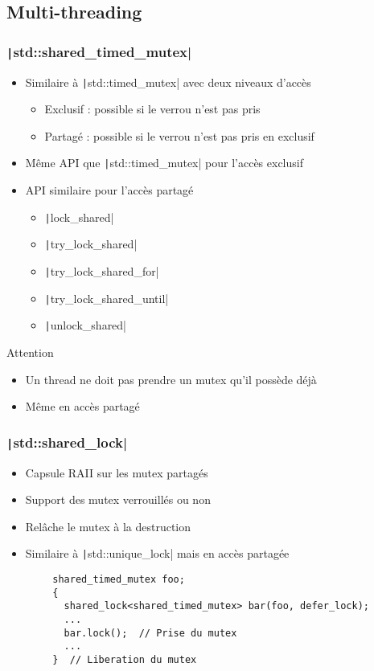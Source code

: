 \documentclass[C++.tex]{subfiles}
\begin{document}
\subsection*{Multi-threading}
\begin{frame}[fragile]
	\frametitle{\texttt|std::shared_timed_mutex|}
	\begin{itemize}
		\item Similaire à \texttt|std::timed_mutex| avec deux niveaux d'accès
		\begin{itemize}
			\item Exclusif : possible si le verrou n'est pas pris
			\item Partagé : possible si le verrou n'est pas pris en exclusif
		\end{itemize}
		\item Même API que \texttt|std::timed_mutex| pour l'accès exclusif
		\item API similaire pour l'accès partagé
		\begin{itemize}
			\item \texttt|lock_shared|
			\item \texttt|try_lock_shared|
			\item \texttt|try_lock_shared_for|
			\item \texttt|try_lock_shared_until|
			\item \texttt|unlock_shared|
		\end{itemize}
	\end{itemize}

	\begin{alertblock}{Attention}
		\begin{itemize}
			\item Un thread ne doit pas prendre un mutex qu'il possède déjà
			\item Même en accès partagé
		\end{itemize}
	\end{alertblock}
\end{frame}

\begin{frame}[fragile]
	\frametitle{\texttt|std::shared_lock|}
	\begin{itemize}
		\item Capsule RAII sur les mutex partagés
		\item Support des mutex verrouillés ou non
		\item Relâche le mutex à la destruction
		\item Similaire à \texttt|std::unique_lock| mais en accès partagée
	\end{itemize}

	\begin{verbatim}
		shared_timed_mutex foo;
		{
		  shared_lock<shared_timed_mutex> bar(foo, defer_lock);
		  ...
		  bar.lock();  // Prise du mutex
		  ...
		}  // Liberation du mutex
	\end{verbatim}
\end{frame}
\end{document}
